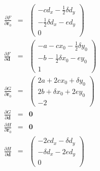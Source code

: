 \documentclass[12pt,a4paper,twoside,openright,BCOR10mm,headsepline,titlepage,abstracton,chapterprefix,final]{scrreprt}
\newcommand\Vector[1]{{\mathbf{#1}}}
\newcommand\Location{\Vector{r}}
\begin{document}
\begin{eqnarray}
  \frac{\partial F}{\partial \Location_0} 
  &=&
  \begin{pmatrix}
    - c d_x - \frac{1}{2} \delta d_y \\
    - \frac{1}{2} \delta d_x - e d_y \\
    0
  \end{pmatrix}
  \\
  \frac{\partial F}{\partial \Vector{d}}
  &=&
  \begin{pmatrix}
    - a - c x_0 - \frac{1}{2} \delta y_0 \\
    - b - \frac{1}{2} \delta x_0 - e y_0 \\
    1
  \end{pmatrix}
  \\
  \frac{\partial G}{\partial \Location_0}
  &=&
  \begin{pmatrix}
    2 a + 2 c x_0 + \delta y_0\\
    2 b + \delta x_0 + 2 e y_0\\
    - 2
  \end{pmatrix}
  \\
  \frac{\partial G}{\partial \Vector{d}}
  &=&
  \Vector{0}
  \\
  \frac{\partial H}{\partial \Location_0}
  &=&
  \Vector{0}
  \\
  \frac{\partial H}{\partial \Vector{d}}
  &=&
  \begin{pmatrix}
    - 2 c d_x - \delta d_y\\
    - \delta d_x - 2 e d_y\\
    0
  \end{pmatrix}
\end{eqnarray}
\end{document}
